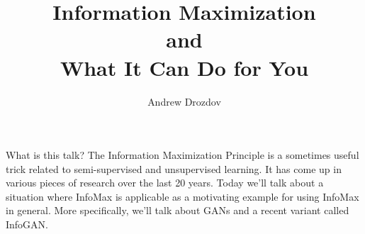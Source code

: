 \documentclass{beamer}
\title[Infomax]{Information Maximization\\and\\What It Can Do for You}
\author{Andrew Drozdov}
\begin{document}
\begin{frame}
  \titlepage
\end{frame}

\begin{frame}{What is this talk?}{}
  The Information Maximization Principle is a sometimes useful trick related to semi-supervised and unsupervised learning. It has come up in various pieces of research over the last 20 years. Today we'll talk about a situation where InfoMax is applicable as a motivating example for using InfoMax in general. More specifically, we'll talk about GANs and a recent variant called InfoGAN.
\end{frame}



% 
\end{document}
